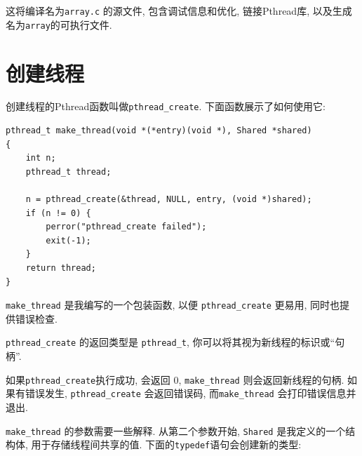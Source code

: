 \documentclass[12pt]{book}
\begin{document}
{%
这将编译名为{\tt array.c} 的源文件, 包含调试信息和优化, 链接Pthread库, 
以及生成名为{\tt array}的可执行文件.


\section{创建线程}

创建线程的Pthread函数叫做\verb"pthread_create".
下面函数展示了如何使用它:

\begin{verbatim}
pthread_t make_thread(void *(*entry)(void *), Shared *shared)
{
    int n;
    pthread_t thread;

    n = pthread_create(&thread, NULL, entry, (void *)shared);
    if (n != 0) {
        perror("pthread_create failed");
        exit(-1);
    }
    return thread;
}
\end{verbatim}

\verb"make_thread" 是我编写的一个包装函数, 以便
\verb"pthread_create" 更易用, 同时也提供错误检查.



\verb"pthread_create" 的返回类型是 \verb"pthread_t", 
你可以将其视为新线程的标识或``句柄''.


如果{\tt pthread\_create}执行成功, 会返回 0, \verb"make_thread" 
则会返回新线程的句柄. 
如果有错误发生, {\tt pthread\_create} 会返回错误码, 
而\verb "make_thread" 会打印错误信息并退出. 

\verb"make_thread" 的参数需要一些解释. 从第二个参数开始, 
{\tt Shared} 是我定义的一个结构体, 用于存储线程间共享的值. 
下面的{\tt typedef}语句会创建新的类型:

}
\end{document}
